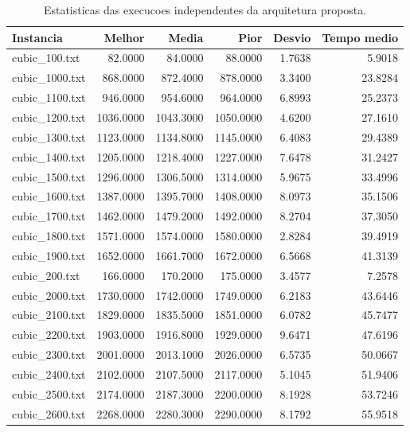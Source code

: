 \begin{table}[h!]
\centering
\caption{Estatisticas das execucoes independentes da arquitetura proposta.}
\label{tab:estatisticas-execucoes}
\scriptsize
\setlength{\tabcolsep}{4pt}
\renewcommand{\arraystretch}{1.15}
\begin{tabular}{lrrrrr}
\hline
\textbf{Instancia} & \textbf{Melhor} & \textbf{Media} & \textbf{Pior} & \textbf{Desvio} & \textbf{Tempo medio} \\
\hline
cubic_100.txt & 82.0000 & 84.0000 & 88.0000 & 1.7638 & 5.9018 \\
cubic_1000.txt & 868.0000 & 872.4000 & 878.0000 & 3.3400 & 23.8284 \\
cubic_1100.txt & 946.0000 & 954.6000 & 964.0000 & 6.8993 & 25.2373 \\
cubic_1200.txt & 1036.0000 & 1043.3000 & 1050.0000 & 4.6200 & 27.1610 \\
cubic_1300.txt & 1123.0000 & 1134.8000 & 1145.0000 & 6.4083 & 29.4389 \\
cubic_1400.txt & 1205.0000 & 1218.4000 & 1227.0000 & 7.6478 & 31.2427 \\
cubic_1500.txt & 1296.0000 & 1306.5000 & 1314.0000 & 5.9675 & 33.4996 \\
cubic_1600.txt & 1387.0000 & 1395.7000 & 1408.0000 & 8.0973 & 35.1506 \\
cubic_1700.txt & 1462.0000 & 1479.2000 & 1492.0000 & 8.2704 & 37.3050 \\
cubic_1800.txt & 1571.0000 & 1574.0000 & 1580.0000 & 2.8284 & 39.4919 \\
cubic_1900.txt & 1652.0000 & 1661.7000 & 1672.0000 & 6.5668 & 41.3139 \\
cubic_200.txt & 166.0000 & 170.2000 & 175.0000 & 3.4577 & 7.2578 \\
cubic_2000.txt & 1730.0000 & 1742.0000 & 1749.0000 & 6.2183 & 43.6446 \\
cubic_2100.txt & 1829.0000 & 1835.5000 & 1851.0000 & 6.0782 & 45.7477 \\
cubic_2200.txt & 1903.0000 & 1916.8000 & 1929.0000 & 9.6471 & 47.6196 \\
cubic_2300.txt & 2001.0000 & 2013.1000 & 2026.0000 & 6.5735 & 50.0667 \\
cubic_2400.txt & 2102.0000 & 2107.5000 & 2117.0000 & 5.1045 & 51.9406 \\
cubic_2500.txt & 2174.0000 & 2187.3000 & 2200.0000 & 8.1928 & 53.7246 \\
cubic_2600.txt & 2268.0000 & 2280.3000 & 2290.0000 & 8.1792 & 55.9518 \\

\end{tabular}
\end{table}
